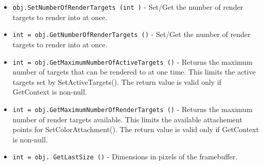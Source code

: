 \begin{itemize}
\item  \verb|obj.SetNumberOfRenderTargets (int )| -  Set/Get the number of render targets to render into at once.

\item  \verb|int = obj.GetNumberOfRenderTargets ()| -  Set/Get the number of render targets to render into at once.

\item  \verb|int = obj.GetMaximumNumberOfActiveTargets ()| -  Returns the maximum number of targets that can be rendered to at one time.
 This limits the active targets set by SetActiveTargets().
 The return value is valid only if GetContext is non-null.

\item  \verb|int = obj.GetMaximumNumberOfRenderTargets ()| -  Returns the maximum number of render targets available. This limits the
 available attachement points for SetColorAttachment().
 The return value is valid only if GetContext is non-null.

\item  \verb|int = obj. GetLastSize ()| -  Dimensions in pixels of the framebuffer.

\end{itemize}
